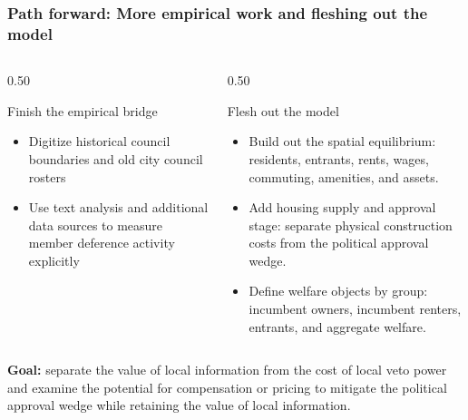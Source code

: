 
\begin{frame}[t]
    \frametitle{Path forward: More empirical work and fleshing out the model}
    \small

    \begin{columns}[T,totalwidth=\textwidth]
        \begin{column}{0.50\textwidth}
            \begin{block}{Finish the empirical bridge}
                \begin{itemize}
                    \item Digitize historical council boundaries and old city council rosters
                    \item Use text analysis and additional data sources to measure member deference activity explicitly
                \end{itemize}
            \end{block}
        \end{column}
          \begin{column}{0.50\textwidth}
            \begin{block}{Flesh out the model}
                \begin{itemize}
                    \item Build out the spatial equilibrium: residents, entrants, rents, wages, commuting, amenities, and assets.
                    \item Add housing supply and approval stage: separate physical construction costs from the political approval wedge.
                    \item Define welfare objects by group: incumbent owners, incumbent renters, entrants, and aggregate welfare.
                \end{itemize}
            \end{block}
        \end{column}
    \end{columns}

    \vspace{0.01em}
    \begin{center}
        \textbf{Goal:} separate the value of local information from the cost of local veto power and examine the potential for compensation or pricing to mitigate the political approval wedge while retaining the value of local information.
    \end{center}
\end{frame}
